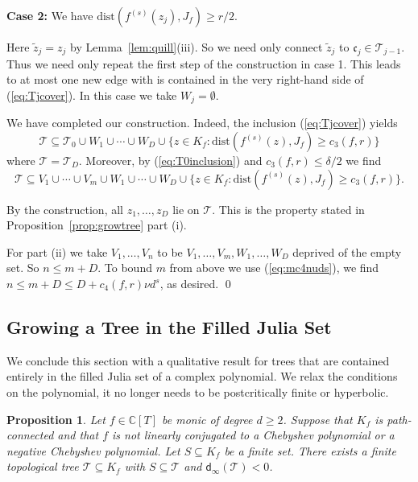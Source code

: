 \documentclass[12pt,oneside,a4]{amsart}
\newcommand{\IC}{\mathbb{C}}
\newcommand{\cT}{\mathcal{T}}
\newcounter{maincounter}
\numberwithin{maincounter}{section}
\numberwithin{equation}{section}
\newtheorem{proposition}[maincounter]{Proposition}
\renewcommand{\subset}{\subseteq}
\begin{document}
\textbf{Case 2:} We have $\mathrm{dist}(f^{(s)}(z_j),J_f)\ge r/2$.

Here $\tilde z_j = z_j$ by Lemma~\ref{lem:quill}(iii). So we need only
connect $\tilde z_j$ to $\mathfrak{c}_j\in \cT_{j-1}$.  
Thus we need only repeat the first step of the construction in
case 1. 
This leads to at most one new edge with is contained in the very
right-hand side of (\ref{eq:Tjcover}). In this case we take $W_j=\emptyset$. 

We have completed our construction. Indeed, the inclusion
(\ref{eq:Tjcover}) yields
\begin{equation*}
  \cT \subset \cT_0 \cup W_1\cup\cdots \cup W_D \cup
  \{z\in K_f : \mathrm{dist}(f^{(s)}(z),J_f)\ge c_3(f,r)\}
\end{equation*}
where $\cT = \cT_D$. Moreover, by (\ref{eq:T0inclusion}) 
and $c_3(f,r)\le \delta/2$ we find
\begin{equation*}
  \cT \subset V_1\cup\cdots\cup V_m \cup W_1\cup\cdots \cup W_D \cup
  \{z\in K_f : \mathrm{dist}(f^{(s)}(z),J_f)\ge c_3(f,r)\}.
\end{equation*}

By the construction, all $z_1,\ldots,z_D$ lie on $\cT$. This is the
property stated in
Proposition~\ref{prop:growtree} part (i).

For part (ii) we  take  $V_1,\ldots,V_n$ to
be  $V_1,\ldots,V_m,W_1,\ldots,W_D$ deprived of the empty set.
So $n\le m+D$. 
To bound $m$ from above we use (\ref{eq:mc4nuds}), we find
$n\le m+D \le D+c_4(f,r) \nu d^s$, as desired. \qed

\subsection{Growing a Tree in the Filled Julia Set}

We conclude this section with a qualitative result for trees that are
contained entirely in the
filled Julia set of a complex polynomial. We relax the conditions on
the polynomial, it no longer needs to be postcritically finite or hyperbolic. 


\begin{proposition}
  \label{prop:cappreper}
  Let $f\in\IC[T]$ be monic of degree $d \geq 2$. Suppose that 
  $K_f$ is path-connected and that $f$ is
  not linearly conjugated to a Chebyshev polynomial or a negative Chebyshev
  polynomial. Let $S \subset K_f$ be a finite set. There exists a
  finite topological tree  $\cT\subset K_f$
  with $S\subset \cT$ and  $\mathsf{d}_\infty(\cT) < 0$.
\end{proposition} 
\end{document}
